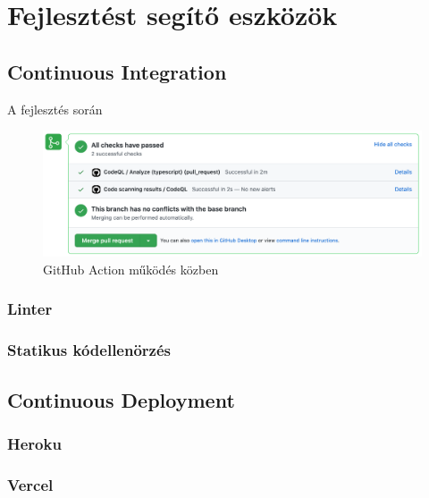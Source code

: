 
\chapter{Fejlesztést segítő eszközök}
\section{Continuous Integration}
A fejlesztés során 

\begin{figure}[!ht]
  \centering
  \includegraphics[width=150mm, keepaspectratio]{figures/ci.png}
  \caption{GitHub Action működés közben}
  \label{fig:GitHubAction}
\end{figure}

\subsection{Linter}

\subsection{Statikus kódellenörzés}

\section{Continuous Deployment}

\subsection{Heroku}

\subsection{Vercel}
